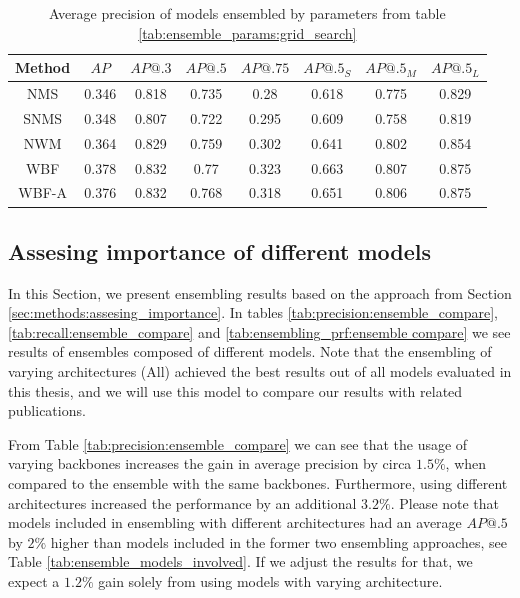 \begin{table}[H]
    \centering
    \begin{tabular}{|c|c|c|c|c|c|c|c|}
        \hline
        Method & $AP$  & $AP@.3$ & $AP@.5$ & $AP@.75$ & $AP@.5_S$ & $AP@.5_M$ & $AP@.5_L$ \\ \hline
        NMS    & 0.346 & 0.818   & 0.735   & 0.28     & 0.618     & 0.775     & 0.829     \\ \hline
        SNMS   & 0.348 & 0.807   & 0.722   & 0.295    & 0.609     & 0.758     & 0.819     \\ \hline
        NWM    & 0.364 & 0.829   & 0.759   & 0.302    & 0.641     & 0.802     & 0.854     \\ \hline
        WBF    & 0.378 & 0.832   & 0.77    & 0.323    & 0.663     & 0.807     & 0.875     \\ \hline
        WBF-A  & 0.376 & 0.832   & 0.768   & 0.318    & 0.651     & 0.806     & 0.875     \\ \hline
    \end{tabular}
    \caption{Average precision of models ensembled by parameters from table \ref{tab:ensemble_params:grid_search}}
    \label{tab:precision:grid_search}
\end{table}


\subsection{Assesing importance of different models}
\label{sec:results:improtance_of_models}
In this Section, we present ensembling results based on the approach from Section \ref{sec:methods:assesing_importance}. In tables \ref{tab:precision:ensemble_compare}, \ref{tab:recall:ensemble_compare} and \ref{tab:ensembling_prf:ensemble compare} we see results of ensembles composed of different models. Note that the ensembling of varying architectures (All) achieved the best results out of all models evaluated in this thesis, and we will use this model to compare our results with related publications.

From Table \ref{tab:precision:ensemble_compare} we can see that the usage of varying backbones increases the gain in average precision by circa $1.5\%$, when compared to the ensemble with the same backbones. Furthermore, using different architectures increased the performance by an additional $3.2\%$. Please note that models included in ensembling with different architectures had an average $AP@.5$ by $2\%$  higher than models included in the former two ensembling approaches, see Table \ref{tab:ensemble_models_involved}. If we adjust the results for that, we expect a $1.2\%$ gain solely from using models with varying architecture.


